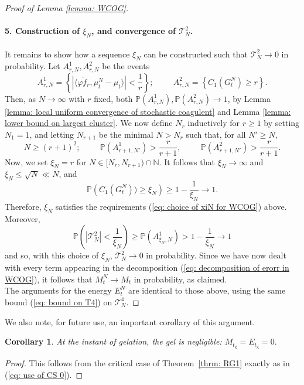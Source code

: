 \documentclass[11pt, notitlepage]{article}
\newtheorem{cor}[thm]{Corollary}
\begin{document}
\begin{proof}[Proof of Lemma \ref{lemma: WCOG}]
\paragraph{5. Construction of $\xi_N$, and convergence of $\mathcal{T}^2_N$.} It remains to show how a sequence $\xi_N$ can be constructed such that $\mathcal{T}^2_N \rightarrow 0$ in probability. Let $A^1_{r,N}, A^2_{r,N}$ be the events \begin{equation} \label{eq: definition of A1rn for WCOG}
       A^1_{r,N}=\left\{ |\langle \varphi \widetilde{f}_r, \mu^N_t-\mu_t\rangle|<\frac{1}{r}\right\}; \hspace{1cm}
       A^2_{r,N}=\left\{C_1(G^N_{t}) \geq r\right\}.
   \end{equation}
 Then, as $N\rightarrow \infty$ with $r$ fixed, both $\mathbb{P}(A^1_{r,N}), \mathbb{P}(A^2_{r,N}) \rightarrow 1$, by Lemma \ref{lemma: local uniform convergence of stochastic coagulent} and Lemma \ref{lemma: lower bound on largest cluster}. We now define $N_r$ inductively for $r\geq 1$ by setting $N_1=1$, and letting $N_{r+1}$ be the minimal $N>N_r$ such that, for all $N'\ge N$,
 \begin{equation}
       \label{eq: recursive definition of Nr for WCOG} N\geq (r+1)^2; \hspace{1cm} \mathbb{P}(A^1_{r+1,N'})>\frac{r}{r+1}, \hspace{1cm} \mathbb{P}(A^2_{r+1,N'})>\frac{r}{r+1}.
 \end{equation} 
 Now, we set $\xi_N=r$ for $N\in [N_r, N_{r+1})\cap\mathbb{N}.$ It follows that $\xi_N \rightarrow \infty$ and $\xi_N\leq \sqrt{N}\ll N$, and
 \begin{equation}
       \mathbb{P}\left(C_1(G^N_t))\geq \xi_N\right)\ge 1-\frac{1}{\xi_N} \rightarrow 1. 
 \end{equation} Therefore, $\xi_N$ satisfies the requirements (\ref{eq: choice of xiN for WCOG}) above. Moreover, \begin{equation}
       \mathbb{P}\left(|\mathcal{T}^2_N| <\frac{1}{\xi_N}\right) \ge \mathbb{P}\left(A^1_{\xi_N,N}\right) > 1-\frac{1}{\xi_N}\rightarrow 1
 \end{equation}
 and so, with this choice of $\xi_N$, $\mathcal{T}^2_N \rightarrow 0$ in probability. Since we have now dealt with every term appearing in the decomposition (\ref{eq: decomposition of erorr in WCOG}), it follows that $M^N_t\rightarrow M_t$ in probability, as claimed. \medskip \\ The arguments for the energy $E^N_t$ are identical to those above, using the same bound (\ref{eq: bound on T4}) on $\mathcal{T}^4_N$. \end{proof} We also note, for future use, an important corollary of this argument.
\begin{cor}\label{corr: gel at tgel} At the instant of gelation, the gel is negligible: $ M_{t_\mathrm{g}}=E_{t_\mathrm{g}}=0.$  \end{cor} \begin{proof} This follows from the critical case of Theorem~\ref{thrm: RG1} exactly as in (\ref{eq: use of CS 0}). \end{proof}
\end{document}
